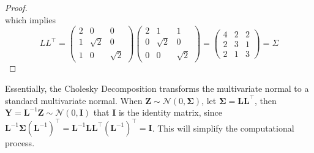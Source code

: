 \documentclass[preprint,12pt]{elsarticle}
\begin{document}
\begin{proof}
\begin{equation}
\end{equation}
which implies
\begin{equation}
    LL^{\top}=
    \begin{pmatrix}
        2 & 0 & 0 \\
        1 & \sqrt{2} & 0\\
        1 & 0 & \sqrt{2}
    \end{pmatrix}
    \begin{pmatrix}
        2 & 1 & 1 \\
        0 & \sqrt{2} & 0 \\
        0 & 0 & \sqrt{2}
    \end{pmatrix}
    =
    \begin{pmatrix}
        4 & 2 & 2\\
        2 & 3 & 1\\
        2 & 1 & 3
    \end{pmatrix}
    =\Sigma
\end{equation}
\end{proof}
Essentially, the Cholesky Decomposition transforms the multivariate normal to a standard multivariate normal. When $\mathbf{Z}\sim \mathcal{N}(0,\boldsymbol{\Sigma})$, let $\boldsymbol{\Sigma}=\mathbf{L}\mathbf{L}^{\top}$, then $\mathbf{Y}=\mathbf{L}^{-1}\mathbf{Z}\sim \mathcal{N}(0, \mathbf{I})$ that $\mathbf{I}$ is the identity matrix, since $\mathbf{L}^{-1}\boldsymbol{\Sigma}(\mathbf{L}^{-1})^{\top}=\mathbf{L}^{-1}\mathbf{L}\mathbf{L}^{\top}(\mathbf{L}^{-1})^{\top}=\mathbf{I}$. This will simplify the computational process. 









\newpage



%







\end{document}
